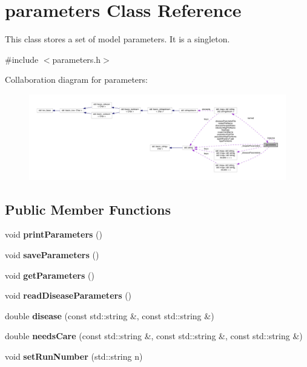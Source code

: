 \hypertarget{classparameters}{}\section{parameters Class Reference}
\label{classparameters}


This class stores a set of model parameters. It is a singleton.  




{\ttfamily \#include $<$parameters.\+h$>$}



Collaboration diagram for parameters\+:\nopagebreak
\begin{figure}[H]
\begin{center}
\leavevmode
\includegraphics[width=350pt]{classparameters__coll__graph}
\end{center}
\end{figure}
\subsection*{Public Member Functions}
\begin{DoxyCompactItemize}
\item 
\mbox{\label{classparameters_a5afb6f0a6eeec826d39795add97c2891}} 
void {\bfseries print\+Parameters} ()
\item 
\mbox{\label{classparameters_a1f9a3b98c893d21631f9611202ba4ad6}} 
void {\bfseries save\+Parameters} ()
\item 
\mbox{\label{classparameters_a62f7b648c3c5c5b71894cdb9825ec5ed}} 
void {\bfseries get\+Parameters} ()
\item 
\mbox{\label{classparameters_a3c25eaa213291dce9de11ace386770a5}} 
void {\bfseries read\+Disease\+Parameters} ()
\item 
\mbox{\label{classparameters_a29ec80156af04d3729397f122717e4df}} 
double {\bfseries disease} (const std\+::string \&, const std\+::string \&)
\item 
\mbox{\label{classparameters_a44a495028fba207fe2de8b2a4d3cae61}} 
double {\bfseries needs\+Care} (const std\+::string \&, const std\+::string \&, const std\+::string \&)
\item 
\mbox{\label{classparameters_ac12f6a6ab14a6f5ce5f48e4c535f3e03}} 
void {\bfseries set\+Run\+Number} (std\+::string n)
\end{DoxyCompactItemize}
